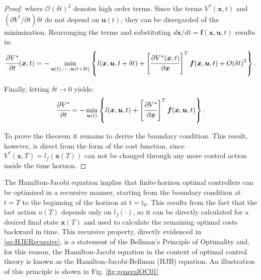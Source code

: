 \documentclass[a4paper,11pt]{book}
\numberwithin{figure}{chapter}
\numberwithin{equation}{chapter}
\numberwithin{table}{chapter}
\theoremstyle{definition}
\begin{document}
\begin{proof}
    \noindent where $\mathcal{O}(\delta t)^2$ denotes high order terms. Since the terms $V^*(\bm{x}, t)$ and $(\partial V^*/\partial t) \delta t$ do not depend on $\bm{u}(t)$, they can be disregarded of the minimization. Rearranging the terms and substituting $d \bm{x} / dt = \bm{f}(\bm{x}, \bm{u}, t)$ results in:
    \begin{equation}
        \cfrac{\partial V^*}{\partial t}(\bm{x}, t) =  - \min_{\bm{u}(t), \cdots, \bm{u}(t+\delta t)} \left\{ l(\bm{x}, \bm{u}, t + \delta t)  + \left[ \cfrac{\partial V^*(\bm{x}, t)}{\partial \bm{x}} \right]^T \bm{f}(\bm{x}, \bm{u}, t) + O(\delta t)^2  \right\}
    .\end{equation}
    
    Finally, letting $\delta t \to 0$ yields:
    \begin{equation}
        \cfrac{\partial V^*}{\partial t} =  - \min_{\bm{u}(t)} \left\{ l(\bm{x}, \bm{u}, t)  + \left[ \cfrac{\partial V^*}{\partial \bm{x}} \right]^T \bm{f}(\bm{x}, \bm{u}, t) \right\}
    .\end{equation}
    
    To prove the theorem it remains to derive the boundary condition. This result, however, is direct from the form of the cost function, since $V^*(\bm{x}, T) = l_f(\bm{x}(T))$ can not be changed through any more control action inside the time horizon.
\end{proof}

The Hamilton-Jacobi equation implies that finite-horizon optimal controllers can be optimized in a recursive manner, starting from the boundary condition at $t = T$ to the beginning of the horizon at $t = t_0$. This results from the fact that the last action $u(T)$ depends only on $l_f(\cdot)$, so it can be directly calculated for a desired final state $\bm{x}(T)$ and used to calculate the remaining optimal costs backward in time. This recursive property, directly evidenced in \eqref{eq:HJERecursive}, is a statement of the Bellman's Principle of Optimality \cite{Bellman:1954} and, for this reason, the Hamilton-Jacobi equation in the context of optimal control theory is known as the Hamilton-Jacobi-Bellman (HJB) equation. An illustration of this principle is shown in Fig. \ref{fig:generalOC01}
\end{document}
